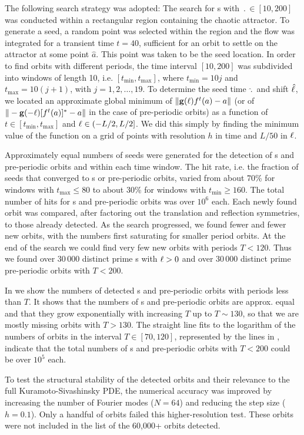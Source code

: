 The following search strategy was adopted: The search for
\rpo s with $\period{} \in [10, 200]$ was conducted within a
rectangular region containing the chaotic attractor.  To
generate a seed, a random point was selected within the
region and the flow  was integrated for a
transient time $t = 40$, sufficient for an orbit to settle on
the attractor at some point $\hat{a}$.  This point was taken
to be the seed location.  In order to find orbits with
different periods, the time interval $[10, 200]$ was
subdivided into windows of length 10, i.e. $[t_\mathrm{min},
t_\mathrm{max}]$, where $t_\mathrm{min} = 10j$ and
$t_\mathrm{max} = 10(j+1)$, with $j = 1, 2, \ldots, 19$.  To
determine the seed time $\hat{\period{}}$ and shift
$\hat{\ell}$, we located an approximate global minimum of
$\| {\bf g}(\ell)f^t(a) - a \|$ (or of $\| -{\bf
g}(-\ell)[f^t(a)]^\ast - a \|$ in the case of pre-periodic
orbits) as a function of $t \in [t_\mathrm{min},
t_\mathrm{max}]$ and $\ell \in (-L/2, L/2]$.  We did this
simply by finding the minimum value of the function on a grid
of points with resolution $h$ in time and $L/50$ in $\ell$.

Approximately equal numbers of seeds were generated for the
detection of \rpo s and pre-periodic orbits and within each
time window.  The hit rate, i.e. the fraction of seeds that
converged to \rpo s or pre-periodic orbits, varied from about
70\% for windows with $t_\mathrm{max} \leq 80$ to about 30\%
for windows with $t_\mathrm{min} \geq 160$.  The total number
of hits for \rpo s and pre-periodic orbits was over $10^6$
each.  Each newly found orbit was compared, after factoring
out the translation and reflection symmetries, to those already
detected.  As the search progressed, we found fewer and fewer
new orbits, with the numbers first saturating for smaller
period orbits.  At the end of the search we could find very
few new orbits with periods $T < 120$.  Thus we found over
30\,000 distinct prime \rpo s with $\ell > 0$ and over
30\,000 distinct prime pre-periodic orbits with $T < 200$.

In  we show the numbers of detected \rpo s
and pre-periodic orbits with periods less than $T$.  It shows
that the numbers of \rpo s and pre-periodic orbits are
approx. equal and that they grow exponentially with
increasing $T$ up to $T \sim 130$, so that we are mostly
missing orbits with $T > 130$.  The straight line fits to the
logarithm of the numbers of orbits in the interval $T \in
[70, 120]$, represented by the lines in ,
indicate that the total numbers of \rpo s and pre-periodic
orbits with $T < 200$ could be over $10^5$ each.

To test the structural stability of the detected orbits and
their relevance to the full Kuramoto-Sivashinsky PDE, the
numerical accuracy was improved by increasing the number of
Fourier modes ($N = 64$) and reducing the step size ($h =
0.1$). Only a handful of orbits failed this higher-resolution
test. These orbits were not included in the list of the
60,000+ orbits detected.
